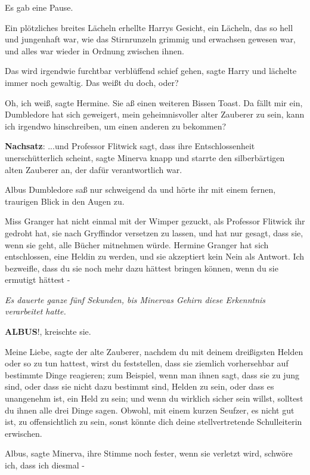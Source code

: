Es gab eine Pause.

Ein plötzliches breites Lächeln erhellte Harrys Gesicht, ein Lächeln, das so
hell und jungenhaft war, wie das Stirnrunzeln grimmig und erwachsen gewesen war,
und alles war wieder in Ordnung zwischen ihnen.

\glqq{}Das wird irgendwie furchtbar verblüffend schief gehen\grqq{}, sagte Harry
und lächelte immer noch gewaltig. \glqq{}Das weißt du doch, oder?\grqq{}

\glqq{}Oh, ich weiß\grqq{}, sagte Hermine. Sie aß einen weiteren Bissen Toast.
\glqq{}Da fällt mir ein, Dumbledore hat sich geweigert, mein geheimnisvoller
alter Zauberer zu sein, kann ich irgendwo hinschreiben, um einen anderen zu
bekommen?\grqq{}

\textbf{Nachsatz}: \glqq{}...und Professor Flitwick sagt, dass ihre
Entschlossenheit unerschütterlich scheint\grqq{}, sagte Minerva knapp und
starrte den silberbärtigen alten Zauberer an, der dafür verantwortlich war.

Albus Dumbledore saß nur schweigend da und hörte ihr mit einem fernen, traurigen
Blick in den Augen zu.

\glqq{}Miss Granger hat nicht einmal mit der Wimper gezuckt, als Professor
Flitwick ihr gedroht hat, sie nach Gryffindor versetzen zu lassen, und hat nur
gesagt, dass sie, wenn sie geht, alle Bücher mitnehmen würde. Hermine Granger
hat sich entschlossen, eine Heldin zu werden, und sie akzeptiert kein Nein als
Antwort. Ich bezweifle, dass du sie noch mehr dazu hättest bringen können, wenn
du sie ermutigt hättest -\grqq{}

\emph{Es dauerte ganze fünf Sekunden, bis Minervas Gehirn diese Erkenntnis
verarbeitet hatte.}

\glqq{}\textbf{ALBUS}!\grqq{}, kreischte sie.

\glqq{}Meine Liebe\grqq{}, sagte der alte Zauberer, \glqq{}nachdem du mit deinem
dreißigsten Helden oder so zu tun hattest, wirst du feststellen, dass sie
ziemlich vorhersehbar auf bestimmte Dinge reagieren; zum Beispiel, wenn man
ihnen sagt, dass sie zu jung sind, oder dass sie nicht dazu bestimmt sind,
Helden zu sein, oder dass es unangenehm ist, ein Held zu sein; und wenn du
wirklich sicher sein willst, solltest du ihnen alle drei Dinge sagen.
Obwohl\grqq{}, mit einem kurzen Seufzer, \glqq{}es nicht gut ist, zu
offensichtlich zu sein, sonst könnte dich deine stellvertretende Schulleiterin
erwischen.\grqq{}

\glqq{}Albus\grqq{}, sagte Minerva, ihre Stimme noch fester, \glqq{}wenn sie
verletzt wird, schwöre ich, dass ich diesmal -\grqq{}

